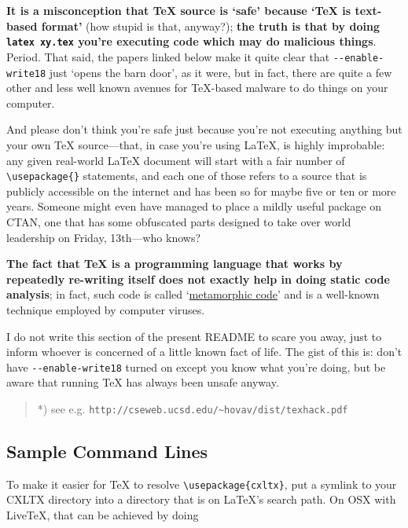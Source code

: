 \textbf{It is a misconception that TeX source is `safe' because `TeX is
text-based format'} (how stupid is that, anyway?); \textbf{the truth is
that by doing \texttt{latex xy.tex} you're executing code which may do
malicious things}. Period. That said, the papers linked below make it
quite clear that \texttt{-{}-enable-write18} just `opens the barn door',
as it were, but in fact, there are quite a few other and less well known
avenues for TeX-based malware to do things on your computer.

And please don't think you're safe just because you're not executing
anything but your own TeX source---that, in case you're using LaTeX, is
highly improbable: any given real-world LaTeX document will start with a
fair number of \texttt{\textbackslash{}usepackage\{\}} statements, and
each one of those refers to a source that is publicly accessible on the
internet and has been so for maybe five or ten or more years. Someone
might even have managed to place a mildly useful package on CTAN, one
that has some obfuscated parts designed to take over world leadership on
Friday, 13th---who knows?

\textbf{The fact that TeX is a programming language that works by
repeatedly re-writing itself does not exactly help in doing static code
analysis}; in fact, such code is called
`\href{http://en.wikipedia.org/wiki/Metamorphic_code}{metamorphic code}'
and is a well-known technique employed by computer viruses.

I do not write this section of the present README to scare you away,
just to inform whoever is concerned of a little known fact of life. The
gist of this is: don't have \texttt{-{}-enable-write18} turned on except
you know what you're doing, but be aware that running TeX has always
been unsafe anyway.

\begin{quote}
*) see e.g.
\texttt{http://cseweb.ucsd.edu/\textasciitilde{}hovav/dist/texhack.pdf}
\end{quote}

\subsection{Sample Command Lines}\label{sample-command-lines}

To make it easier for TeX to resolve
\texttt{\textbackslash{}usepackage\{cxltx\}}, put a symlink to your
CXLTX directory into a directory that is on LaTeX's search path. On OSX
with LiveTeX, that can be achieved by doing

